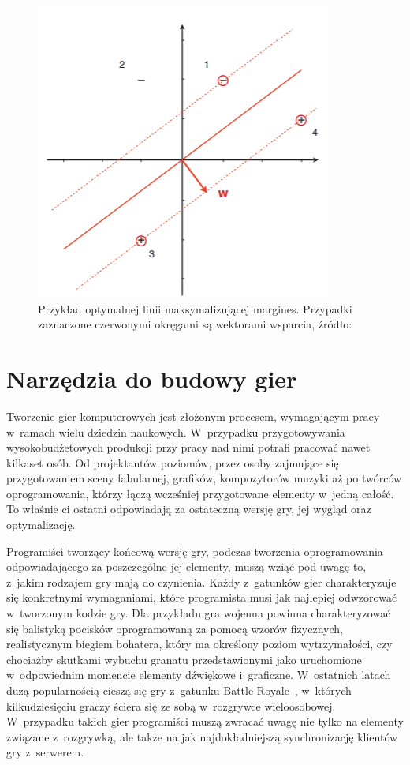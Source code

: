 \begin{figure}
	\centering
	\includegraphics[width=0.5\linewidth]{images/svm.png}
	\caption{Przykład optymalnej linii maksymalizującej margines. Przypadki zaznaczone czerwonymi okręgami są wektorami wsparcia, źródło:~\cite{flach_2012} }
	\label{fig:svm}
\end{figure}

\section{Narzędzia do budowy gier}
Tworzenie gier komputerowych jest złożonym procesem, wymagającym pracy w~ramach wielu dziedzin naukowych. W~przypadku przygotowywania wysokobudżetowych produkcji przy pracy nad nimi potrafi pracować nawet kilkaset osób. Od projektantów poziomów, przez osoby zajmujące się przygotowaniem sceny fabularnej, grafików, kompozytorów muzyki aż po twórców oprogramowania, którzy łączą wcześniej przygotowane elementy w~jedną całość. To właśnie ci ostatni odpowiadają za ostateczną wersję gry, jej wygląd oraz optymalizację. 

Programiści tworzący końcową wersję gry, podczas tworzenia oprogramowania odpowiadającego za poszczególne jej elementy, muszą wziąć pod uwagę to, z~jakim rodzajem gry mają do czynienia. Każdy z~gatunków gier charakteryzuje się konkretnymi wymaganiami, które programista musi jak najlepiej odwzorować w~tworzonym kodzie gry. Dla przykładu gra wojenna powinna charakteryzować się balistyką pocisków oprogramowaną za pomocą wzorów fizycznych, realistycznym biegiem bohatera, który ma określony poziom wytrzymałości, czy chociażby skutkami wybuchu granatu przedstawionymi jako uruchomione w~odpowiednim momencie elementy dźwiękowe i~graficzne. W~ostatnich latach duzą popularnością cieszą się gry z~gatunku Battle Royale~\cite{network_traffic_moll}, w~których kilkudziesięciu graczy ściera się ze sobą w~rozgrywce wieloosobowej. W~przypadku takich gier programiści muszą zwracać uwagę nie tylko na elementy związane z~rozgrywką, ale także na jak najdokładniejszą synchronizację klientów gry z~serwerem.

